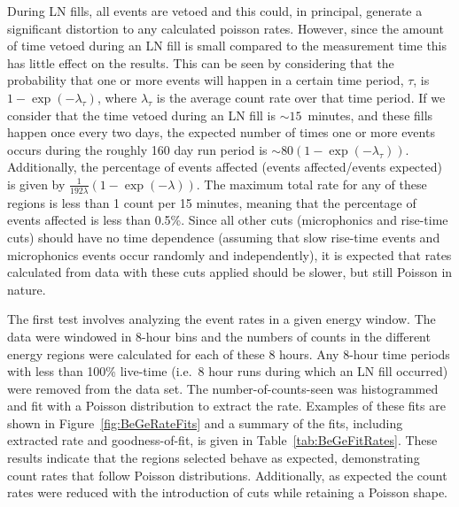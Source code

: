 	During LN fills, all events are vetoed and this could, in principal, generate a significant distortion to any calculated poisson rates.  However, since the amount of time vetoed during an LN fill is small compared to the measurement time this has little effect on the results.  This can be seen by considering that the probability that one or more events will happen in a certain time period, $\tau$, is $1 - \exp(-\lambda_{\tau})$, where $\lambda_{\tau}$ is the average count rate over that time period.  If we consider that the time vetoed during an LN fill is $\sim15$~minutes, and these fills happen once every two days, the expected number of times one or more events occurs during the roughly 160 day run period is $\sim80 (1 - \exp(-\lambda_{\tau}) )$.  Additionally, the percentage of events affected (events affected/events expected) is given by $\frac{1}{192 \lambda}\left(1 - \exp(-\lambda)\right)$.  The maximum total rate for any of these regions is less than 1 count per 15 minutes, meaning that the percentage of events affected is less than 0.5\%.  Since all other cuts (microphonics and rise-time cuts) should have no time dependence (assuming that slow rise-time events and microphonics events occur randomly and independently), it is expected that rates calculated from data with these cuts applied should be slower, but still Poisson in nature.  
	
	The first test involves analyzing the event rates in a given energy window.  The data were windowed in 8-hour bins and the numbers of counts in the different energy regions were calculated for each of these 8 hours.  Any 8-hour time periods with less than 100\% live-time (i.e.~8 hour runs during which an LN fill occurred) were removed from the data set.  The number-of-counts-seen was histogrammed and fit with a Poisson distribution to extract the rate.  Examples of these fits are shown in	Figure~\ref{fig:BeGeRateFits} and a summary of the fits, including extracted rate and goodness-of-fit, is given in Table~\ref{tab:BeGeFitRates}.  These results indicate that the regions selected behave as expected, demonstrating count rates that follow Poisson distributions.  Additionally, as expected the count rates were reduced with the introduction of cuts while retaining a Poisson shape.  
	
